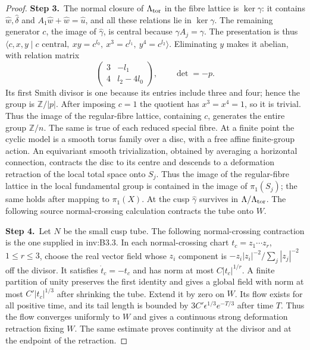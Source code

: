 \documentclass[11pt,a4paper]{article}
\theoremstyle{plain}
\theoremstyle{definition}
\begin{document}
\begin{proof}
\par\smallskip\noindent\textbf{Step 3.}\ The normal closure of $\Lambda_{\rm tor}$ in the fibre lattice is
$\ker\gamma$: it contains $\hat w,\hat\delta$ and
$A_1\hat w+\hat w=\hat u$, and all these relations lie in
$\ker\gamma$. The remaining generator $c$, the image of
$\hat\gamma$, is central because $\gamma A_j=\gamma$.
The presentation is thus
$\langle c,x,y\mid c\text{ central},\ xy=c^{l_0},\
x^3=c^{l_1},\ y^4=c^{l_2}\rangle$.
Eliminating $y$ makes it abelian, with relation matrix
\[
 \begin{pmatrix}3&-l_1\\4&l_2-4l_0\end{pmatrix},
 \qquad\det=-p.
\]
Its first Smith divisor is one because its entries include three
and four; hence the group is $\mathbb Z/|p|$.
After imposing $c=1$ the quotient has $x^3=x^4=1$, so it is trivial.
Thus the image of the regular-fibre lattice, containing $c$, generates
the entire group $\mathbb Z/n$. The same is true of each reduced special
fibre. At a finite point the cyclic model is a smooth torus family
over a disc, with a free affine finite-group action. An equivariant
smooth trivialization, obtained by averaging a horizontal connection,
contracts the disc to its centre and descends to a deformation
retraction of the local total space onto $S_j$. Thus the image of
the regular-fibre lattice in the local fundamental group is contained
in the image of $\pi_1(S_j)$; the same holds after mapping to
$\pi_1(X)$. At the cusp $\hat\gamma$ survives in
$\Lambda/\Lambda_{\rm tor}$. The following source normal-crossing calculation contracts the tube onto $W$.

\par\smallskip\noindent\textbf{Step 4.}\ Let $N$ be the small cusp tube. The following normal-crossing contraction is the one supplied in inv:B3.3. In each normal-crossing chart
$t_c=z_1\cdots z_r$, $1\le r\le3$, choose the real vector field
whose $z_i$ component is
$-z_i|z_i|^{-2}/\sum_j|z_j|^{-2}$ off the divisor.
It satisfies $\dot t_c=-t_c$ and has norm at most
$C|t_c|^{1/r}$. A finite partition of unity preserves the first
identity and gives a global field with norm at most
$C'|t_c|^{1/3}$ after shrinking the tube. Extend it by zero on $W$.
Its flow exists for all positive time, and its tail length is
bounded by $3C'\epsilon^{1/3}e^{-T/3}$ after time $T$.
Thus the flow converges uniformly to $W$ and gives a continuous
strong deformation retraction fixing $W$. The same estimate proves
continuity at the divisor and at the endpoint of the retraction.


\end{proof}
\end{document}
